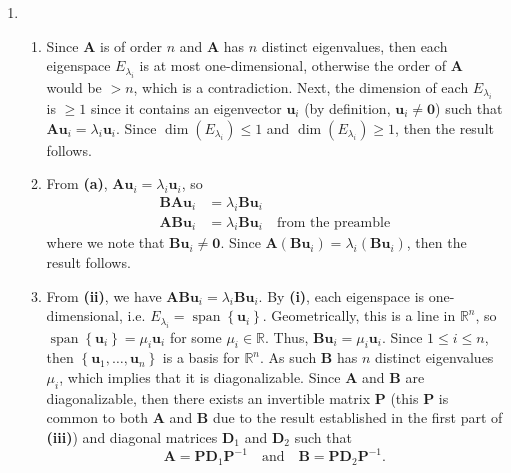 \documentclass[12pt]{article}
\begin{document}
\begin{enumerate}[label=\textbf{(\alph*)}]
    \itemsep 0em
    \item \begin{enumerate}[label=\textbf{(\roman*)}]
        \itemsep 0em
        \item Since $\mathbf{A}$ is of order $n$ and $\mathbf{A}$ has $n$ distinct eigenvalues, then each eigenspace $E_{\lambda_i}$ is at most one-dimensional, otherwise the order of $\mathbf{A}$ would be $>n$, which is a contradiction.
        \newline
        \newline Next, the dimension of each $E_{\lambda_i}$ is $\ge 1$ since it contains an eigenvector $\mathbf{u}_i$ (by definition, $\mathbf{u}_i\ne \mathbf{0}$) such that $\mathbf{Au}_i=\lambda_i\mathbf{u}_i$.
        \newline
        \newline Since $\operatorname{dim}\left(E_{\lambda_i}\right)\le 1$ and $\operatorname{dim}\left(E_{\lambda_i}\right)\ge 1$, then the result follows.
        \item From \textbf{(a)}, $\mathbf{Au}_i=\lambda_i\mathbf{u}_i$, so \begin{align*}
            \mathbf{BAu}_i&=\lambda_i\mathbf{Bu}_i \\
            \mathbf{ABu}_i&=\lambda_i\mathbf{Bu}_i\quad\text{from the preamble}
        \end{align*}
        where we note that $\mathbf{Bu}_i\ne\mathbf{0}$. Since $\mathbf{A}\left(\mathbf{Bu}_i\right)=\lambda_i\left(\mathbf{Bu}_i\right)$, then the result follows.
        \item From \textbf{(ii)}, we have $\mathbf{ABu}_i=\lambda_i\mathbf{Bu}_i$. By \textbf{(i)}, each eigenspace is one-dimensional, i.e. $E_{\lambda_i}=\operatorname{span}\left\{\mathbf{u}_i\right\}$. Geometrically, this is a line in $\mathbb{R}^n$, so $\operatorname{span}\left\{\mathbf{u}_i\right\}=\mu_i\mathbf{u}_i$ for some $\mu_i\in\mathbb{R}$. Thus, $\mathbf{Bu}_i=\mu_i\mathbf{u}_i$. Since $1\le i \le n$, then $\left\{\mathbf{u}_1,\ldots,\mathbf{u}_n\right\}$ is a basis for $\mathbb{R}^n$. As such $\mathbf{B}$ has $n$ distinct eigenvalues $\mu_i$, which implies that it is diagonalizable.
        \newline
        \newline Since $\mathbf{A}$ and $\mathbf{B}$ are diagonalizable, then there exists an invertible matrix $\mathbf{P}$ (this $\mathbf{P}$ is common to both $\mathbf{A}$ and $\mathbf{B}$ due to the result established in the first part of \textbf{(iii)}) and diagonal matrices $\mathbf{D}_1$ and $\mathbf{D}_2$ such that \[\mathbf{A}=\mathbf{PD}_1\mathbf{P}^{-1}\quad\text{and}\quad \mathbf{B}=\mathbf{PD}_2\mathbf{P}^{-1}.\]

\end{enumerate}
\end{enumerate}
\end{document}
